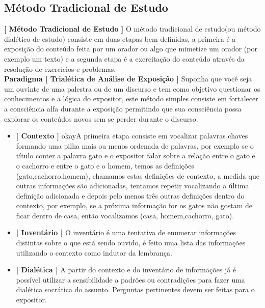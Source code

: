 \documentclass[10pt,a4paper]{report}
\begin{document}
\subsection{Método Tradicional de Estudo}

\hspace{\baselineskip}

\textbf{[ Método Tradicional de Estudo ]} O método tradicional de estudo(ou método dialético de estudo) consiste em duas etapas bem definidas, a primeira é a exposição do conteúdo feita por um orador ou algo que mimetize um orador (por exemplo um texto) e a segunda etapa é a exercitação do conteúdo através da resolução de exercícios e problemas.\\

\textbf{Paradigma [ Trialética de Análise de Exposição ]} Suponha que você seja um ouvinte de uma palestra ou de um discurso e tem como objetivo questionar os conhecimentos e a lógica do expositor, este método simples consiste em fortalecer a consciência alfa durante a exposição permitindo que sua consciência possa explorar os conteúdos novos sem se perder durante o discurso.

\begin{itemize}
	\item[ (i) ] \textbf{[ Contexto ]} okayA primeira etapa consiste em vocalizar palavras chaves formando uma pilha mais ou menos ordenada de palavras, por exemplo se o título conter a palavra gato e o expositor falar sobre a relação entre o gato e o cachorro e entre o gato e o homem, temos as definições (gato,cachorro,homem), chamamos estas definições de contexto, a medida que outras informações são adicionadas, tentamos repetir vocalizando a última definição adicionada e depois pelo menos três outras definições dentro do contexto, por exemplo, se a próxima informação for os gatos não gostam de ficar dentro de casa, então vocalizamos (casa, homem,cachorro, gato).
	\item[ (ii) ] \textbf{[ Inventário ]} O inventário é uma tentativa de enumerar informações distintas sobre o que está sendo ouvido, é feito uma lista das informações utilizando o contexto como indutor da lembrança.
	\item[ (iii) ] \textbf{[ Dialética ]} A partir do contexto e do inventário de informações já é possível utilizar a sensibilidade a padrões ou contradições para fazer uma dialética socrática do assunto. Perguntas pertinentes devem ser feitas para o expositor.
\end{itemize}
\end{document}
